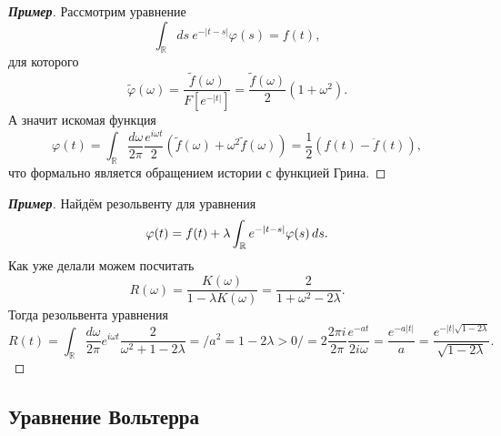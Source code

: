\begin{proof}[\textbf{Пример}]
 Рассмотрим уравнение
\begin{equation*}
	\int_{\mathbb{R}}  ds\ e^{-|t-s|} \varphi(s) = f(t),
\end{equation*}
для которого
\begin{equation*}
	\tilde{\varphi}(\omega) = \frac{\tilde{f}(\omega)}{F\left[e^{-|t|}\right]} = \frac{\tilde{f}(\omega)}{2} (1 + \omega^2).
\end{equation*}
А значит искомая функция
\begin{equation*}
	\varphi(t) = \int_{\mathbb{R}}  \frac{d \omega}{2 \pi} \frac{e^{i \omega t}}{2} \left(\tilde{f}(\omega) + \omega^2 \tilde{f}(\omega)\right) = \frac{1}{2} \left(f(t) - \ddot{f}(t)\right),
\end{equation*}
что формально является обращением истории с функцией Грина.
\end{proof}


\begin{proof}[\textbf{Пример}] Найдём резольвенту для уравнения
\begin{equation*}
	\varphi(t) = f(t) + \lambda \int_{\mathbb{R}}  e^{-|t-s|} \varphi(s) \, d s.
\end{equation*}
Как уже делали можем посчитать
\begin{equation*}
	R(\omega) = \frac{K(\omega)}{1-\lambda K(\omega)} = \frac{2}{1 + \omega^2 - 2 \lambda}.
\end{equation*}
Тогда резольвента уравнения
\begin{equation*}
	R(t) = \int_{\mathbb{R}} \frac{d \omega}{2\pi} e^{i \omega t} \frac{2}{\omega^2 + 1 - 2 \lambda}= \bigg/ a^2 = 1- 2\lambda > 0 \bigg/ = 2\frac{2 \pi i}{2\pi} \frac{e^{-at}}{2 i \omega}  = \frac{e^{-a |t|}}{a} = \frac{e^{-|t| \sqrt{1-2\lambda}}}{\sqrt{1-2\lambda}}.
\end{equation*}
\end{proof}


\subsection*{Уравнение Вольтерра}


